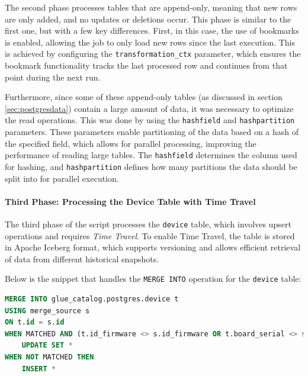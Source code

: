 The second phase processes tables that are append-only, meaning that new rows are only added, and no updates or deletions occur. This phase is similar to the first one, but with a few key differences. First, in this case, the use of bookmarks is enabled, allowing the job to only load new rows since the last execution. This is achieved by configuring the \texttt{transformation\_ctx} parameter, which ensures the bookmark functionality tracks the last processed row and continues from that point during the next run.

Furthermore, since some of these append-only tables (as discussed in section \ref{sec:postgresdata}) contain a large amount of data, it was necessary to optimize the read operations. This was done by using the \texttt{hashfield} and \texttt{hashpartition} parameters. These parameters enable partitioning of the data based on a hash of the specified field, which allows for parallel processing, improving the performance of reading large tables. The \texttt{hashfield} determines the column used for hashing, and \texttt{hashpartition} defines how many partitions the data should be split into for parallel execution.

\paragraph{Third Phase: Processing the Device Table with Time Travel}

The third phase of the script processes the \texttt{device} table, which involves upsert operations and requires \textit{Time Travel}. To enable Time Travel, the table is stored in Apache Iceberg format, which supports versioning and allows efficient retrieval of data from different historical snapshots.

Below is the snippet that handles the \texttt{MERGE INTO} operation for the \texttt{device} table:

\begin{lstlisting}[language=SQL, caption=MERGE INTO for Postgres extraction]
MERGE INTO glue_catalog.postgres.device t
USING merge_source s
ON t.id = s.id
WHEN MATCHED AND (t.id_firmware <> s.id_firmware OR t.board_serial <> s.board_serial OR t.id_board_model <> s.id_board_model OR t.last_ip <> s.last_ip OR t.city <> s.city OR t.connection_kind <> s.connection_kind OR t.bridge_firm <> s.bridge_firm OR t.cloud_pin <> s.cloud_pin OR t.mirror <> s.mirror) THEN
    UPDATE SET *
WHEN NOT MATCHED THEN
    INSERT *
\end{lstlisting}

